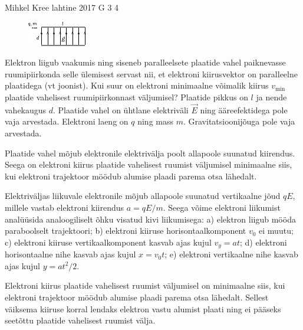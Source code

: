 {Mihkel Kree} %
{lahtine} %
{2017} %
{G 3} %
{4} %
{
\ifStatement
\begin{figure}
	\vspace{-10pt}
	\hspace{-10pt}
	\includegraphics[width=\linewidth]{2017-lahg-03-elJoonisMK.pdf}
\end{figure}

Elektron liigub vaakumis ning siseneb paralleelsete plaatide vahel paiknevasse ruumipiirkonda selle ülemisest servast nii, et elektroni kiirusvektor on paralleelne plaatidega (vt joonist). Kui suur on elektroni minimaalne võimalik kiirus $v_\mathrm{min}$ plaatide vahelisest ruumipiirkonnast väljumisel? Plaatide pikkus on $l$ ja nende vahekaugus $d$. Plaatide vahel on ühtlane elektriväli $\vec{E}$ ning ääreefektidega pole vaja arvestada. Elektroni laeng on $q$ ning mass $m$. Gravitatsioonijõuga pole vaja arvestada.
\fi


\ifHint
Plaatide vahel mõjub elektronile elektrivälja poolt allapoole suunatud kiirendus. Seega on elektroni kiirus plaatide vahelisest ruumist väljumisel minimaalne siis, kui elektroni trajektoor möödub alumise plaadi parema otsa lähedalt.
\fi


\ifSolution
Elektriväljas liikuvale elektronile mõjub allapoole suunatud vertikaalne jõud $qE$, millele vastab elektroni kiirendus $a=qE/m$. Seega võime elektroni liikumist analüüsida analoogiliselt õhku visatud kivi liikumisega: a) elektron liigub mööda paraboolselt trajektoori; b) elektroni kiiruse horisontaalkomponent $v_0$ ei muutu; c) elektroni kiiruse vertikaalkomponent kasvab ajas kujul $v_y=at$; d) elektroni horisontaalne nihe kasvab ajas kujul $x=v_0t$; e) elektroni vertikaalne nihe kasvab ajas kujul $y=at^2/2$.

Elektroni kiirus plaatide vahelisest ruumist väljumisel on minimaalne siis, kui elektroni trajektoor möödub alumise plaadi parema otsa lähedalt. Sellest väiksema kiiruse korral lendaks elektron vastu alumist plaati ning ei pääseks seetõttu plaatide vahelisest ruumist välja.

}
